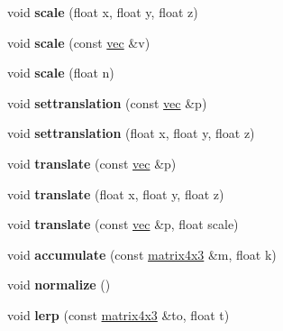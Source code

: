 \begin{DoxyCompactItemize}
\mbox{\label{structmatrix4x3_a8f790e023b6776b933759593c3bf6040}} 
void {\bfseries scale} (float x, float y, float z)
\item 
\mbox{\label{structmatrix4x3_af8f269327591b40e00169eef76d2a1cf}} 
void {\bfseries scale} (const \hyperlink{structvec}{vec} \&v)
\item 
\mbox{\label{structmatrix4x3_aa1f23e996a6b47d01e0fc01ff111c239}} 
void {\bfseries scale} (float n)
\item 
\mbox{\label{structmatrix4x3_ae80b196ace13b43a81984dd52377c595}} 
void {\bfseries settranslation} (const \hyperlink{structvec}{vec} \&p)
\item 
\mbox{\label{structmatrix4x3_a7f9b079c1873af80a5619530f85b52b6}} 
void {\bfseries settranslation} (float x, float y, float z)
\item 
\mbox{\label{structmatrix4x3_a76b0d5cb3e5cc1b459bf572e3cb30e78}} 
void {\bfseries translate} (const \hyperlink{structvec}{vec} \&p)
\item 
\mbox{\label{structmatrix4x3_ac05e517ba54f3b0148bfab7c8105ce1d}} 
void {\bfseries translate} (float x, float y, float z)
\item 
\mbox{\label{structmatrix4x3_a27711a504c193f613c1269b910f0668e}} 
void {\bfseries translate} (const \hyperlink{structvec}{vec} \&p, float scale)
\item 
\mbox{\label{structmatrix4x3_ab520672043a0ae67cc6768af9a87d291}} 
void {\bfseries accumulate} (const \hyperlink{structmatrix4x3}{matrix4x3} \&m, float k)
\item 
\mbox{\label{structmatrix4x3_a942640f941f8c9327c293d7e76f364b5}} 
void {\bfseries normalize} ()
\item 
\mbox{\label{structmatrix4x3_aaacd55df0550f9483a27b58c38c054fc}} 
void {\bfseries lerp} (const \hyperlink{structmatrix4x3}{matrix4x3} \&to, float t)
\item 

\end{DoxyCompactItemize}
